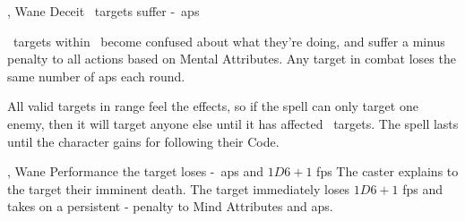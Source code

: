   {\mWater, \mFate}%
  {Wane}%
  {\duplicated}%
  {Deceit}%
  {\spellArea\ targets suffer -~\glspl{ap}}%
  {
    \spellArea\ targets within \spellRange\ become confused about what they're doing, and suffer a minus  penalty to all actions based on Mental Attributes.
    Any target in combat loses the same number of \glspl{ap} each round.

    All valid targets in range feel the effects, so if the spell can only target one enemy, then it will target anyone else until it has affected \spellArea\ targets.
    The spell lasts until the character gains  for following their Code.
  }

  {\mWater, \mFate}%
  {Wane}%
  {\divergent}%
  {Performance}%
  {the target loses -~\glspl{ap} and $1D6 + 1$ \glspl{fp}}%
  {
    The caster explains to the target their imminent death.
    The target immediately loses $1D6+1$ \glspl{fp} and takes on a persistent - penalty to Mind Attributes and \glspl{ap}.
  }
